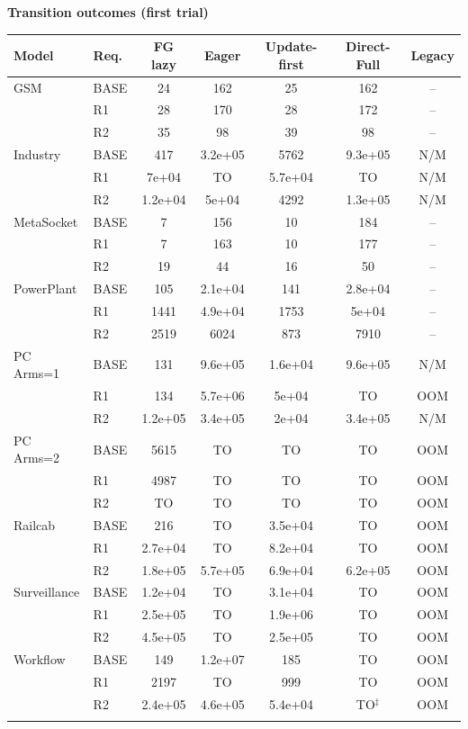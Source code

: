 \clearpage\noindent\textbf{Transition outcomes (first trial)}\par\smallskip
\begingroup\scriptsize\setlength{\tabcolsep}{3pt}
\begin{tabular}{@{}llccccc@{}}
\toprule
Model & Req. & FG lazy & Eager & Update-first & Direct-Full & Legacy\\
\midrule
GSM & BASE & 24 & 162 & 25 & 162 & --\\
 & R1 & 28 & 170 & 28 & 172 & --\\
 & R2 & 35 & 98 & 39 & 98 & --\\
\addlinespace[2pt]
Industry & BASE & 417 & 3.2e+05 & 5762 & 9.3e+05 & N/M\\
 & R1 & 7e+04 & TO & 5.7e+04 & TO & N/M\\
 & R2 & 1.2e+04 & 5e+04 & 4292 & 1.3e+05 & N/M\\
\addlinespace[2pt]
MetaSocket & BASE & 7 & 156 & 10 & 184 & --\\
 & R1 & 7 & 163 & 10 & 177 & --\\
 & R2 & 19 & 44 & 16 & 50 & --\\
\addlinespace[2pt]
PowerPlant & BASE & 105 & 2.1e+04 & 141 & 2.8e+04 & --\\
 & R1 & 1441 & 4.9e+04 & 1753 & 5e+04 & --\\
 & R2 & 2519 & 6024 & 873 & 7910 & --\\
\addlinespace[2pt]
PC Arms=1 & BASE & 131 & 9.6e+05 & 1.6e+04 & 9.6e+05 & N/M\\
 & R1 & 134 & 5.7e+06 & 5e+04 & TO & OOM\\
 & R2 & 1.2e+05 & 3.4e+05 & 2e+04 & 3.4e+05 & N/M\\
\addlinespace[2pt]
PC Arms=2 & BASE & 5615 & TO & TO & TO & OOM\\
 & R1 & 4987 & TO & TO & TO & OOM\\
 & R2 & TO & TO & TO & TO & OOM\\
\addlinespace[2pt]
Railcab & BASE & 216 & TO & 3.5e+04 & TO & OOM\\
 & R1 & 2.7e+04 & TO & 8.2e+04 & TO & OOM\\
 & R2 & 1.8e+05 & 5.7e+05 & 6.9e+04 & 6.2e+05 & OOM\\
\addlinespace[2pt]
Surveillance & BASE & 1.2e+04 & TO & 3.1e+04 & TO & OOM\\
 & R1 & 2.5e+05 & TO & 1.9e+06 & TO & OOM\\
 & R2 & 4.5e+05 & TO & 2.5e+05 & TO & OOM\\
\addlinespace[2pt]
Workflow & BASE & 149 & 1.2e+07 & 185 & TO & OOM\\
 & R1 & 2197 & TO & 999 & TO & OOM\\
 & R2 & 2.4e+05 & 4.6e+05 & 5.4e+04 & TO$^{\ddagger}$ & OOM\\
\addlinespace[2pt]
\bottomrule
\end{tabular}\endgroup

